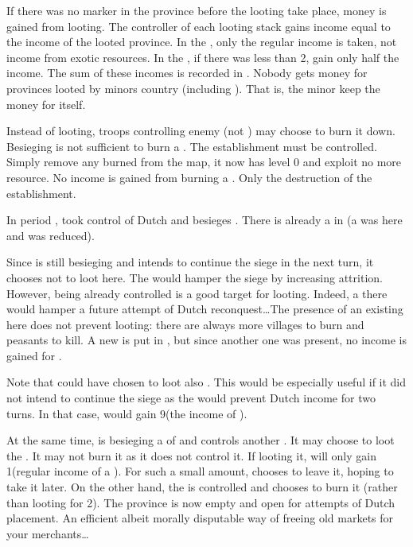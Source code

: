 \bparag If there was no \PILLAGE marker in the province before the looting
take place, money is gained from looting.
\bparag The controller of each looting stack gains income equal to the income
of the looted province.
\bparag In the \ROTW, only the regular income is taken, not income from exotic
resources.
\bparag In the \ROTW, if there was less than 2\LD, gain only half the income.
\bparag The sum of these incomes is recorded in .
\bparag Nobody gets money for provinces looted by minors country (including
\VASSAL). That is, the minor keep the money for itself.

\aparag[Burning \TP]
\bparag Instead of looting, troops controlling enemy \TP (not \COL) may choose
to burn it down.
\bparag Besieging is not sufficient to burn a \TP. The establishment must be
controlled.
\bparag Simply remove any burned \TP from the map, it now has level 0 and
exploit no more resource.
\bparag No income is gained from burning a \TP. Only the destruction of the
establishment.

\begin{exemple}[Looting]
  In period , \SPA took control of Dutch \provinceUtrecht and
  besieges \provinceZeeland. There is already a \PILLAGE\Facemoins in
  \provinceUtrecht (a \PILLAGE\Faceplus was here and was reduced).

  Since \SPA is still besieging \provinceZeeland and intends to continue the
  siege in the next turn, it chooses not to loot here. The \PILLAGE would
  hamper the siege by increasing attrition. However, \provinceUtrecht being
  already controlled is a good target for looting. Indeed, a \PILLAGE there
  would hamper a future attempt of Dutch reconquest\ldots The presence of an
  existing \PILLAGE here does not prevent looting: there are always more
  villages to burn and peasants to kill. A new \PILLAGE\Faceplus is put in
  \provinceUtrecht, but since another one was present, no income is gained for
  \SPA.

  Note that \SPA could have chosen to loot also \provinceZeeland. This would
  be especially useful if it did not intend to continue the siege as the
  \PILLAGE would prevent Dutch income for two turns. In that case, \SPA would
  gain 9\ducats (the income of \provinceZeeland).
\end{exemple}  

\begin{exemple}[Burning \TP]
  At the same time, \HOL is besieging a \TP\Facemoins of \paysPortugal and
  controls another \TP\Faceplus. It may choose to loot the \TP\Facemoins. It
  may not burn it as it does not control it. If looting it, \HOL will only
  gain 1\ducats (regular income of a \TP\Facemoins). For such a small amount,
  \HOL chooses to leave it, hoping to take it later. On the other hand, the
  \TP\Faceplus is controlled and \HOL chooses to burn it (rather than looting
  for 2\ducats). The province is now empty and open for attempts of Dutch \TP
  placement. An efficient albeit morally disputable way of freeing old markets
  for your merchants\ldots
\end{exemple}

